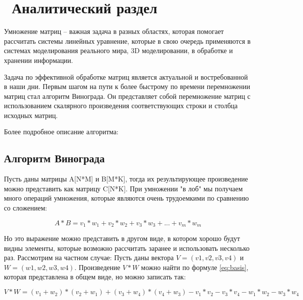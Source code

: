 \chapter{ Аналитический раздел}
\label{cha:analysis}

Умножение матриц -- важная задача в разных областях, которая помогает рассчитать системы линейных уравнение, которые в свою очередь применяются в системах моделирования реального мира, 3D моделировании, в обработке и хранении информации. 

Задача по эффективной обработке матриц является актуальной и востребованной в наши дни. Первым шагом на пути к более быстрому по времени перемножении матриц стал алгоритм Винограда. Он представляет собой перемножение матриц с использованием скалярного произведения соответствующих строки и столбца исходных матриц.

Более подробное описание алгоритма: 

\section{ Алгоритм Винограда}

Пусть даны матрицы A[N*M] и B[M*K], тогда их результирующее произведение можно представить как матрицу C[N*K]. При умножении "в лоб" мы получаем много операций умножения, которые являются очень трудоемкими по сравнению со сложением:

\begin{equation}
    A * B = v_1*w_1 + v_2 * w_2 + v_3 * w_3 + ... + v_m * w_m
    \label{eq:basis}
\end{equation}

Но это выражение можно представить в другом виде, в котором хорошо будут видны элементы, которые возможно рассчитать заранее и использовать несколько раз. Рассмотрим на частном случае:
Пусть даны вектора $V = (v1, v2, v3, v4)$ и $W = (w1, w2, w3, w4)$. Произведение $V*W$ можно найти по формуле \ref{eq:basis}, которая представлена в общем виде, но можно записать так:

\begin{equation}
    V*W = (v_1 + w_2)*(v_2 + w_1) + (v_3 + w_4)*(v_4+w_3) - v_1 * v_2 - v_3 * v_4 - w_1 * w_2 - w_3 * w_4
    \label{eq:win}
\end{equation}

